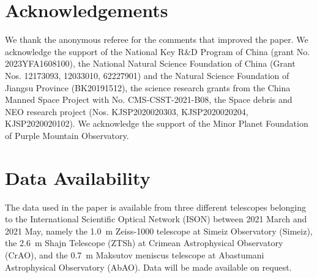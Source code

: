 \documentclass[fleqn,usenatbib]{mnras}
\begin{document}









\section*{Acknowledgements}

We thank the anonymous referee for the comments that improved the paper. We acknowledge the support of the National Key R\&D Program of China (grant No. 2023YFA1608100), the National Natural Science Foundation of China (Grant Nos. 12173093, 12033010, 62227901) and the Natural Science Foundation of Jiangsu Province (BK20191512), the science research grants from the China Manned Space Project with No. CMS-CSST-2021-B08, the Space debris and NEO research project (Nos. KJSP2020020303, KJSP2020020204, KJSP2020020102). We acknowledge the support of the Minor Planet Foundation of Purple Mountain Observatory. 

\section*{Data Availability}

The data used in the paper is available from three different telescopes belonging to the International Scientific Optical Network (ISON) between 2021 March and 2021 May, namely the \qty{1.0}{\m} Zeiss-1000 telescope at Simeiz Observatory (Simeiz), the \qty{2.6}{\m} Shajn Telescope (ZTSh) at Crimean Astrophysical Observatory (CrAO), and the \qty{0.7}{\m} Maksutov meniscus telescope at Abastumani Astrophysical Observatory (AbAO). Data will be made available on request. 




 


\end{document}
